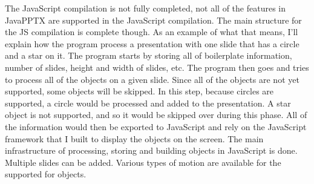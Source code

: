 \documentclass[12pt,twoside]{reedthesis}
\begin{document}
The JavaScript compilation is not fully completed, not all of the features in JavaPPTX are supported in the JavaScript compilation. The main structure for the JS compilation is complete though. As an example of what that means, I'll explain how the program process a presentation with one slide that has a circle and a star on it. The program starts by storing all of boilerplate information, number of slides, height and width of slides, etc. The program then goes and tries to process all of the objects on a given slide. Since all of the objects are not yet supported, some objects will be skipped. In this step, because circles are supported, a circle would be processed and added to the presentation. A star object is not supported, and so it would be skipped over during this phase. All of the information would then be exported to JavaScript and rely on the JavaScript framework that I built to display the objects on the screen. The main infrastructure of processing, storing and building objects in JavaScript is done. Multiple slides can be added. Various types of motion are available for the supported for objects. 
\end{document}
